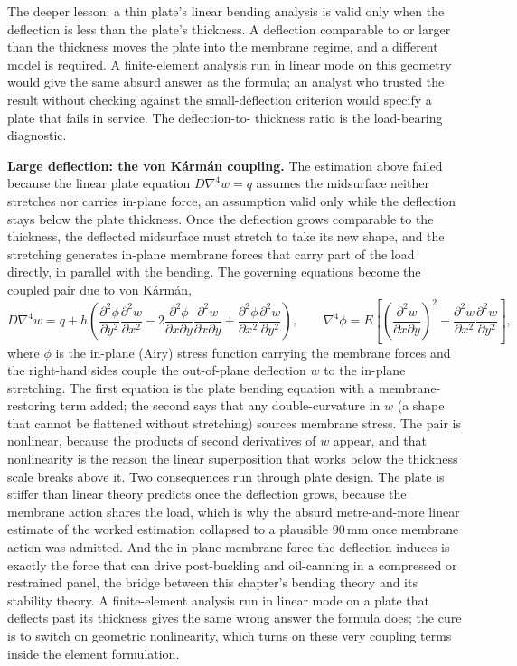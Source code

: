 \begin{estimation}
The deeper lesson: a thin plate's linear bending analysis is valid
only when the deflection is less than the plate's thickness. A
deflection comparable to or larger than the thickness moves the
plate into the membrane regime, and a different model is required.
A finite-element analysis run in linear mode on this geometry would
give the same absurd answer as the formula; an analyst who trusted
the result without checking against the small-deflection criterion
would specify a plate that fails in service. The deflection-to-
thickness ratio is the load-bearing diagnostic.
\end{estimation}

\begin{mastery}
\textbf{Large deflection: the von K\'arm\'an coupling.} The estimation
above failed because the linear plate equation $D\nabla^4 w = q$ assumes
the midsurface neither stretches nor carries in-plane force, an
assumption valid only while the deflection stays below the plate
thickness. Once the deflection grows comparable to the thickness, the
deflected midsurface must stretch to take its new shape, and the
stretching generates in-plane membrane forces that carry part of the
load directly, in parallel with the bending. The governing equations
become the coupled pair due to von K\'arm\'an,
\[
D\nabla^4 w = q + h\!\left(
\frac{\partial^2\phi}{\partial y^2}\frac{\partial^2 w}{\partial x^2}
- 2\frac{\partial^2\phi}{\partial x\partial y}
\frac{\partial^2 w}{\partial x\partial y}
+ \frac{\partial^2\phi}{\partial x^2}\frac{\partial^2 w}{\partial y^2}
\right),
\qquad
\nabla^4\phi = E\!\left[
\left(\frac{\partial^2 w}{\partial x\partial y}\right)^2
- \frac{\partial^2 w}{\partial x^2}\frac{\partial^2 w}{\partial y^2}
\right],
\]
where $\phi$ is the in-plane (Airy) stress function carrying the membrane
forces and the right-hand sides couple the out-of-plane deflection $w$ to
the in-plane stretching. The first equation is the plate bending equation
with a membrane-restoring term added; the second says that any
double-curvature in $w$ (a shape that cannot be flattened without
stretching) sources membrane stress. The pair is nonlinear, because the
products of second derivatives of $w$ appear, and that nonlinearity is
the reason the linear superposition that works below the thickness scale
breaks above it. Two consequences run through plate design. The plate is
stiffer than linear theory predicts once the deflection grows, because
the membrane action shares the load, which is why the absurd
metre-and-more linear estimate of the worked estimation collapsed to a
plausible $90\,\si{\milli\meter}$ once membrane action was admitted.
And the in-plane membrane force the deflection induces is exactly the
force that can drive post-buckling and oil-canning in a compressed or
restrained panel, the bridge between this chapter's bending theory and
its stability theory. A finite-element analysis run in linear mode on a
plate that deflects past its thickness gives the same wrong answer the
formula does; the cure is to switch on geometric nonlinearity, which
turns on these very coupling terms inside the element formulation.
\end{mastery}

